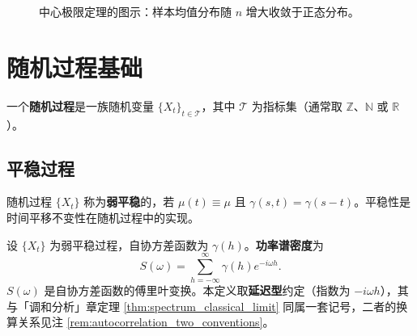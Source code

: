 \begin{figure}[htbp]
\centering
{}
\caption{中心极限定理的图示：样本均值分布随 $n$ 增大收敛于正态分布。}
\label{fig:clt}
\end{figure}

\section{随机过程基础}\label{sec:stochastic_processes}

\begin{definition}[随机过程]\label{def:stochastic_process}
一个\textbf{随机过程}是一族随机变量 $\{X_t\}_{t \in \mathcal{T}}$，其中 $\mathcal{T}$ 为指标集（通常取 $\mathbb{Z}$、$\mathbb{N}$ 或 $\mathbb{R}$）。
\end{definition}

\subsection{平稳过程}

\begin{definition}[平稳过程]\label{def:stationary_process}
随机过程 $\{X_t\}$ 称为\textbf{弱平稳}的，若 $\mu(t) \equiv \mu$ 且 $\gamma(s, t) = \gamma(s-t)$。平稳性是时间平移不变性在随机过程中的实现。
\end{definition}

\begin{definition}[功率谱密度]\label{def:power_spectral_density}
设 $\{X_t\}$ 为弱平稳过程，自协方差函数为 $\gamma(h)$。\textbf{功率谱密度}为
\[
S(\omega) = \sum_{h=-\infty}^{\infty} \gamma(h) e^{-i\omega h}.
\]
$S(\omega)$ 是自协方差函数的傅里叶变换。本定义取\textbf{延迟型}约定（指数为 $-i\omega h$），其与「调和分析」章定理 \ref{thm:spectrum_classical_limit} 同属一套记号，二者的换算关系见注 \ref{rem:autocorrelation_two_conventions}。
\end{definition}

